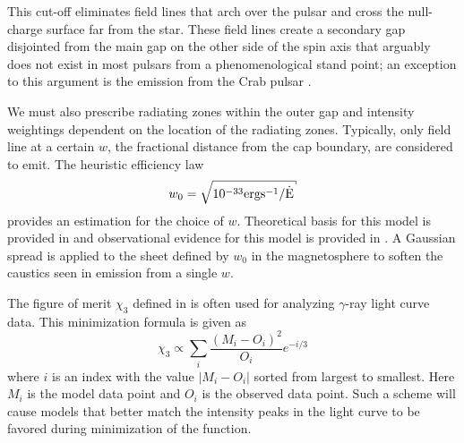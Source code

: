 This cut-off eliminates field lines that arch over the
pulsar and cross the null-charge surface far from the 
star.  These field lines create a secondary gap disjointed
from the main gap on the other side of the spin axis that
arguably does not exist in most pulsars from a phenomenological
stand point; an exception to this argument is the 
emission from the Crab pulsar \citep{moffett1996multifrequency}.

We must also prescribe radiating zones within the outer gap
and intensity weightings dependent on the location of the radiating
zones.  Typically, only field line at a certain $w$, the fractional distance
from the cap boundary, are considered to emit.  
The heuristic efficiency law 
\begin{equation}
w_0=\sqrt{10^{-33}\rm{erg s^{-1}}/\dot{E}}
\end{equation}
provides an estimation for the choice of $w$.
Theoretical basis for this model is provided in \cite{arons2006theory}
and observational evidence for this model is
provided in \cite{psrcat}.
A Gaussian spread is applied to the sheet defined
by $w_0$ in the magnetosphere to soften the
caustics seen in emission from a single $w$.

The figure of merit $\chi_3$ defined in
\cite{romani2010constraining} is often used for analyzing $\gamma$-ray light
curve data.  This minimization formula is given as
\begin{equation}
\chi_3\propto\sum_i\frac{(M_i-O_i)^2}{O_i} e^{-i/3}
\end{equation}
where $i$ is an index with the value $|M_i-O_i|$ sorted from largest
to smallest.  Here $M_i$ is the model data point
and $O_i$ is the observed data point.  Such a scheme will 
cause models that better match the intensity peaks in the light
curve to be favored during minimization of the function.
  
